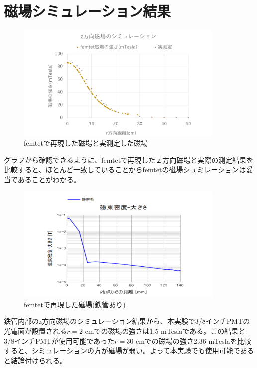 \section{磁場シミュレーション結果}
\begin{figure}[H]
	\centering
		\includegraphics[width=10cm]{fig/iguchi/femtetgraph.pdf}
	\caption{femtetで再現した磁場と実測定した磁場}
	\label{femtegraph}
\end{figure}

グラフから確認できるように、femtetで再現したｚ方向磁場と実際の測定結果を比較すると、ほとんど一致していることからfemtetの磁場シュミレーションは妥当であることがわかる。
\begin{figure}[H]
	\centering
		\includegraphics[width=10cm]{fig/iguchi/maggraphinFe.pdf}
	\caption{femtetで再現した磁場(鉄管あり)}
	\label{maggraphinFe}
\end{figure}
鉄管内部のz方向磁場のシミュレーション結果から、本実験で3/8インチPMTの光電面が設置される$r=2$ cmでの磁場の強さは1.5 mTeslaである。この結果と3/8インチPMTが使用可能であった$r=30$ cmでの磁場の強さ2.36 mTeslaを比較すると、シミュレーションの方が磁場が弱い。よって本実験でも使用可能であると結論付けられる。




